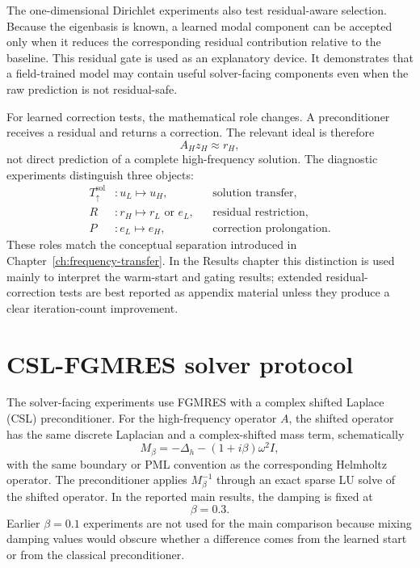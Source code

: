 The one-dimensional Dirichlet experiments also test residual-aware selection.
Because the eigenbasis is known, a learned modal component can be accepted
only when it reduces the corresponding residual contribution relative to the
baseline. This residual gate is used as an explanatory device. It demonstrates
that a field-trained model may contain useful solver-facing components even
when the raw prediction is not residual-safe.

For learned correction tests, the mathematical role changes. A
preconditioner receives a residual and returns a correction. The relevant
ideal is therefore
\begin{equation}
    A_H z_H \approx r_H,
    \label{eq:setup-correction-task}
\end{equation}
not direct prediction of a complete high-frequency solution. The diagnostic
experiments distinguish three objects:
\begin{align}
    T_{\uparrow}^{\mathrm{sol}} &: u_L \mapsto u_H,
    &&\text{solution transfer}, \label{eq:setup-object-solution}\\
    R &: r_H \mapsto r_L \text{ or } e_L,
    &&\text{residual restriction}, \label{eq:setup-object-restriction}\\
    P &: e_L \mapsto e_H,
    &&\text{correction prolongation}. \label{eq:setup-object-prolongation}
\end{align}
These roles match the conceptual separation introduced in
Chapter~\ref{ch:frequency-transfer}. In the Results chapter this distinction
is used mainly to interpret the warm-start and gating results; extended
residual-correction tests are best reported as appendix material unless they
produce a clear iteration-count improvement.

\section{CSL-FGMRES solver protocol}
\label{sec:setup-solver-protocol}

The solver-facing experiments use FGMRES with a complex shifted Laplace (CSL)
preconditioner. For the high-frequency operator $A$, the shifted operator has
the same discrete Laplacian and a complex-shifted mass term, schematically
\begin{equation}
    M_\beta
    =
    -\Delta_h-(1+i\beta)\omega^2 I,
    \label{eq:setup-csl-operator}
\end{equation}
with the same boundary or PML convention as the corresponding Helmholtz
operator. The preconditioner applies $M_\beta^{-1}$ through an exact sparse
LU solve of the shifted operator. In the reported main results, the damping is
fixed at
\begin{equation}
    \beta=0.3.
    \label{eq:setup-csl-beta}
\end{equation}
Earlier $\beta=0.1$ experiments are not used for the main comparison because
mixing damping values would obscure whether a difference comes from the
learned start or from the classical preconditioner.

